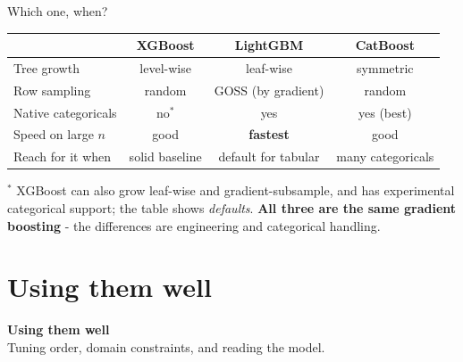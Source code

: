 \documentclass[aspectratio=169]{beamer}
\newcommand{\sectiontransition}[2]{%
  \begin{frame}[plain]
    \vfill
    \begin{center}
      {\Large\color{popblue}\textbf{#1}}\\[10pt]
      {\normalsize #2}
    \end{center}
    \vfill
  \end{frame}}
\begin{document}
\begin{frame}{Which one, when?}
  \begin{center}\small
    \renewcommand{\arraystretch}{1.3}
    \begin{tabular}{l c c c}
      \toprule
                          & \textbf{XGBoost}   & \textbf{LightGBM}    & \textbf{CatBoost} \\
      \midrule
      Tree growth         & level-wise         & leaf-wise            & symmetric \\
      Row sampling        & random             & GOSS (by gradient)   & random \\
      Native categoricals & no$^{*}$           & yes                  & yes (best) \\
      Speed on large $n$  & good               & \textbf{fastest}     & good \\
      Reach for it when   & solid baseline     & default for tabular  & many categoricals \\
      \bottomrule
    \end{tabular}
  \end{center}
  \vfill
  \footnotesize $^{*}$ XGBoost can also grow leaf-wise and gradient-subsample, and has experimental
  categorical support; the table shows \emph{defaults}. \textbf{All three are the same gradient
  boosting} - the differences are engineering and categorical handling.
\end{frame}

\section{Using them well}
\sectiontransition{Using them well}{Tuning order, domain constraints, and reading the model.}
\end{document}
